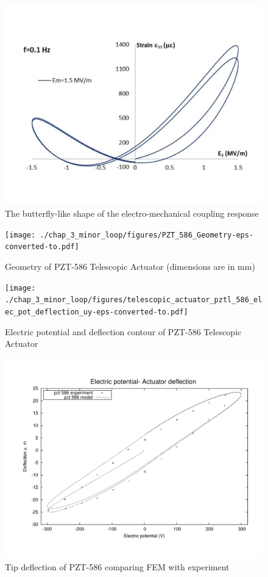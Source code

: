 \begin{figure}
\centering
\includegraphics[width=5.0in]
{./chap_3_minor_loop/figures/fig_3_9_the_butterfly-like_shape_of_the_electro-mechanical_coupling_response.pdf}
\caption{The butterfly-like shape of the electro-mechanical coupling response}
\label{fig_3_9_the_butterfly-like_shape_of_the_electro-mechanical_coupling_response}
\end{figure}


\begin{figure}
\centering
\texttt{[image: ./chap\_3\_minor\_loop/figures/PZT\_586\_Geometry-eps-converted-to.pdf]}
\caption{Geometry of PZT-586 Telescopic Actuator (dimensions are in mm)}
\label{fig:Geometry_PZT-586}
\end{figure}


\begin{figure}
\centering
\texttt{[image: ./chap\_3\_minor\_loop/figures/telescopic\_actuator\_pztl\_586\_elec\_pot\_deflection\_uy-eps-converted-to.pdf]}
\caption{Electric potential and deflection contour of PZT-586 Telescopic Actuator}
\label{fig:PZT-586_response}
\end{figure}

\begin{figure}
\centering
\includegraphics[width=5.0in]{./chap_3_minor_loop/figures/result_pzt_586.pdf}
\caption{Tip deflection of PZT-586 comparing FEM with experiment}
\label{fig:PZT_586_XP_Calib}
\end{figure}

